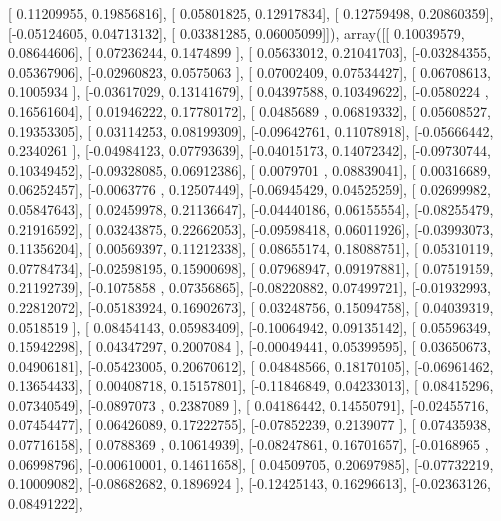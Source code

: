 \documentclass{article}
\begin{document}
       [ 0.11209955,  0.19856816],
       [ 0.05801825,  0.12917834],
       [ 0.12759498,  0.20860359],
       [-0.05124605,  0.04713132],
       [ 0.03381285,  0.06005099]]), array([[ 0.10039579,  0.08644606],
       [ 0.07236244,  0.1474899 ],
       [ 0.05633012,  0.21041703],
       [-0.03284355,  0.05367906],
       [-0.02960823,  0.0575063 ],
       [ 0.07002409,  0.07534427],
       [ 0.06708613,  0.1005934 ],
       [-0.03617029,  0.13141679],
       [ 0.04397588,  0.10349622],
       [-0.0580224 ,  0.16561604],
       [ 0.01946222,  0.17780172],
       [ 0.0485689 ,  0.06819332],
       [ 0.05608527,  0.19353305],
       [ 0.03114253,  0.08199309],
       [-0.09642761,  0.11078918],
       [-0.05666442,  0.2340261 ],
       [-0.04984123,  0.07793639],
       [-0.04015173,  0.14072342],
       [-0.09730744,  0.10349452],
       [-0.09328085,  0.06912386],
       [ 0.0079701 ,  0.08839041],
       [ 0.00316689,  0.06252457],
       [-0.0063776 ,  0.12507449],
       [-0.06945429,  0.04525259],
       [ 0.02699982,  0.05847643],
       [ 0.02459978,  0.21136647],
       [-0.04440186,  0.06155554],
       [-0.08255479,  0.21916592],
       [ 0.03243875,  0.22662053],
       [-0.09598418,  0.06011926],
       [-0.03993073,  0.11356204],
       [ 0.00569397,  0.11212338],
       [ 0.08655174,  0.18088751],
       [ 0.05310119,  0.07784734],
       [-0.02598195,  0.15900698],
       [ 0.07968947,  0.09197881],
       [ 0.07519159,  0.21192739],
       [-0.1075858 ,  0.07356865],
       [-0.08220882,  0.07499721],
       [-0.01932993,  0.22812072],
       [-0.05183924,  0.16902673],
       [ 0.03248756,  0.15094758],
       [ 0.04039319,  0.0518519 ],
       [ 0.08454143,  0.05983409],
       [-0.10064942,  0.09135142],
       [ 0.05596349,  0.15942298],
       [ 0.04347297,  0.2007084 ],
       [-0.00049441,  0.05399595],
       [ 0.03650673,  0.04906181],
       [-0.05423005,  0.20670612],
       [ 0.04848566,  0.18170105],
       [-0.06961462,  0.13654433],
       [ 0.00408718,  0.15157801],
       [-0.11846849,  0.04233013],
       [ 0.08415296,  0.07340549],
       [-0.0897073 ,  0.2387089 ],
       [ 0.04186442,  0.14550791],
       [-0.02455716,  0.07454477],
       [ 0.06426089,  0.17222755],
       [-0.07852239,  0.2139077 ],
       [ 0.07435938,  0.07716158],
       [ 0.0788369 ,  0.10614939],
       [-0.08247861,  0.16701657],
       [-0.0168965 ,  0.06998796],
       [-0.00610001,  0.14611658],
       [ 0.04509705,  0.20697985],
       [-0.07732219,  0.10009082],
       [-0.08682682,  0.1896924 ],
       [-0.12425143,  0.16296613],
       [-0.02363126,  0.08491222],
\end{document}
